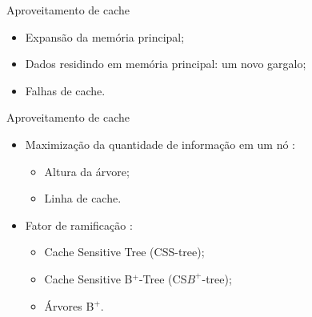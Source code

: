 \begin{frame}{Aproveitamento de cache}
    \begin{itemize}
        \item Expansão da memória principal;
        \item Dados residindo em memória principal: um novo gargalo;
        \item Falhas de cache.
    \end{itemize}
\end{frame}

\begin{frame}{Aproveitamento de cache}
    \begin{itemize}
        \item Maximização da quantidade de informação em um nó \cite{paper-effect-node-size-cache-b-trees}:
        \begin{itemize}
            \item Altura da árvore;
            \item Linha de cache.
        \end{itemize}
        \item Fator de ramificação \cite{paper-making-btree-cache}:
        \begin{itemize}
            \item Cache Sensitive Tree (CSS-tree);
            \item Cache Sensitive B$^+$-Tree (CS$B^+$-tree);
            \item Árvores B$^+$.
        \end{itemize}
    \end{itemize}
\end{frame}
